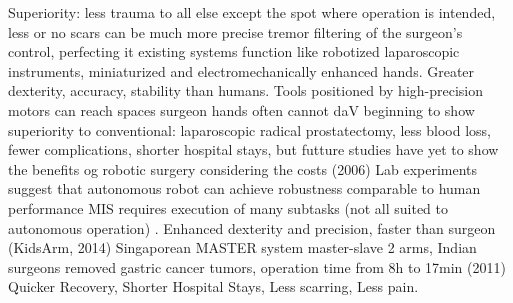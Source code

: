 Superiority:
less trauma to all else except the spot where operation is intended, less or no scars
can be much more precise
tremor filtering of the surgeon's control, perfecting it
existing systems function like robotized laparoscopic instruments, miniaturized and electromechanically enhanced hands. Greater dexterity, accuracy, stability than humans. Tools positioned by high-precision motors can reach spaces surgeon hands often cannot \citep{bib:docatadist}
daV beginning to show superiority to  conventional: laparoscopic radical prostatectomy, less blood loss, fewer complications, shorter hospital stays, but futture studies have yet to show the benefits og robotic surgery considering the costs (2006) \citep{bib:docatadist}
Lab experiments suggest that autonomous robot can achieve robustness comparable to human performance \citep{bib:raven_debride}
MIS requires execution of many subtasks (not all suited to autonomous operation) \citep{bib:raven_debride}.
Enhanced dexterity and precision, faster than surgeon (KidsArm, 2014)
Singaporean MASTER system master-slave 2 arms, Indian surgeons removed gastric cancer tumors, operation time from 8h to 17min (2011)
Quicker Recovery, Shorter Hospital Stays, Less scarring, Less pain.



